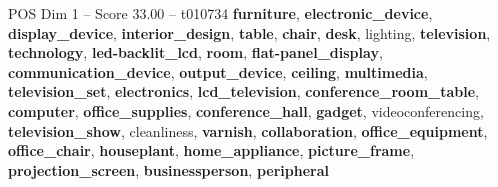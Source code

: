 \begin{textsample}{POS Dim 1 – Score 33.00 – t010734}  \label{ex:f1_pos_007}
\textbf{furniture}, \textbf{electronic\_device}, \textbf{display\_device}, \textbf{interior\_design}, \textbf{table}, \textbf{chair}, \textbf{desk}, lighting, \textbf{television}, \textbf{technology}, \textbf{led-backlit\_lcd}, \textbf{room}, \textbf{flat-panel\_display}, \textbf{communication\_device}, \textbf{output\_device}, \textbf{ceiling}, \textbf{multimedia}, \textbf{television\_set}, \textbf{electronics}, \textbf{lcd\_television}, \textbf{conference\_room\_table}, \textbf{computer}, \textbf{office\_supplies}, \textbf{conference\_hall}, \textbf{gadget}, videoconferencing, \textbf{television\_show}, cleanliness, \textbf{varnish}, \textbf{collaboration}, \textbf{office\_equipment}, \textbf{office\_chair}, \textbf{houseplant}, \textbf{home\_appliance}, \textbf{picture\_frame}, \textbf{projection\_screen}, \textbf{businessperson}, \textbf{peripheral}

\end{textsample}
